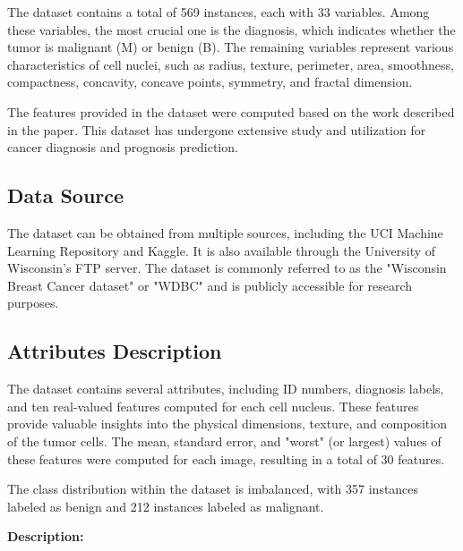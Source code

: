 \documentclass[conference]{IEEEtran}
\begin{document}
The dataset contains a total of 569 instances, each with 33 variables. Among these variables, the most crucial one is the diagnosis, which indicates whether the tumor is malignant (M) or benign (B). The remaining variables represent various characteristics of cell nuclei, such as radius, texture, perimeter, area, smoothness, compactness, concavity, concave points, symmetry, and fractal dimension.

The features provided in the dataset were computed based on the work described in the paper\cite{bennett1992robust}.
This dataset has undergone extensive study and utilization for cancer diagnosis and prognosis prediction.

\subsection{Data Source}

The dataset can be obtained from multiple sources, including the UCI Machine Learning Repository\cite{UCI} and Kaggle\cite{Kaggle}. It is also available through the University of Wisconsin's FTP server. The dataset is commonly referred to as the "Wisconsin Breast Cancer dataset" or "WDBC" and is publicly accessible for research purposes.

\subsection{Attributes Description}

The dataset contains several attributes, including ID numbers, diagnosis labels, and ten real-valued features computed for each cell nucleus. These features provide valuable insights into the physical dimensions, texture, and composition of the tumor cells. The mean, standard error, and "worst" (or largest) values of these features were computed for each image, resulting in a total of 30 features.

The class distribution within the dataset is imbalanced, with 357 instances labeled as benign and 212 instances labeled as malignant.

\vspace{0.2cm}
\textbf{Description:}
\end{document}
